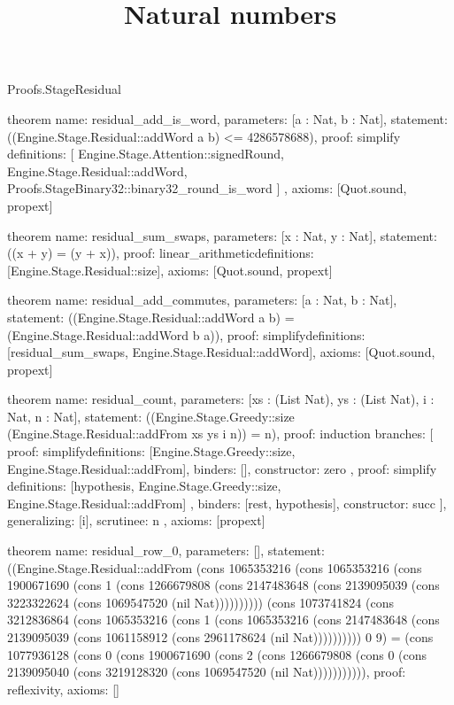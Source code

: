 \begin{lexlean}{Proofs.StageResidual}
\title{Natural numbers}
\begin{semanticmodule}
theorem{
  name: residual_add_is_word,
  parameters: [a : Nat, b : Nat],
  statement: ((Engine.Stage.Residual::addWord a b) <= 4286578688),
  proof: simplify{
    definitions: [
      Engine.Stage.Attention::signedRound,
      Engine.Stage.Residual::addWord,
      Proofs.StageBinary32::binary32_round_is_word
    ]
  },
  axioms: [Quot.sound, propext]
}

theorem{
  name: residual_sum_swaps,
  parameters: [x : Nat, y : Nat],
  statement: ((x + y) = (y + x)),
  proof: linear_arithmetic{definitions: [Engine.Stage.Residual::size]},
  axioms: [Quot.sound, propext]
}

theorem{
  name: residual_add_commutes,
  parameters: [a : Nat, b : Nat],
  statement: ((Engine.Stage.Residual::addWord a b) = (Engine.Stage.Residual::addWord b a)),
  proof: simplify{definitions: [residual_sum_swaps, Engine.Stage.Residual::addWord]},
  axioms: [Quot.sound, propext]
}

theorem{
  name: residual_count,
  parameters: [xs : (List Nat), ys : (List Nat), i : Nat, n : Nat],
  statement: ((Engine.Stage.Greedy::size (Engine.Stage.Residual::addFrom xs ys i n)) = n),
  proof: induction{
    branches: [
      {
        proof: simplify{definitions: [Engine.Stage.Greedy::size, Engine.Stage.Residual::addFrom]},
        binders: [],
        constructor: zero
      },
      {
        proof: simplify{
          definitions: [hypothesis, Engine.Stage.Greedy::size, Engine.Stage.Residual::addFrom]
        },
        binders: [rest, hypothesis],
        constructor: succ
      }
    ],
    generalizing: [i],
    scrutinee: n
  },
  axioms: [propext]
}

theorem{
  name: residual_row_0,
  parameters: [],
  statement: ((Engine.Stage.Residual::addFrom (cons 1065353216 (cons 1065353216 (cons 1900671690 (cons 1 (cons 1266679808 (cons 2147483648 (cons 2139095039 (cons 3223322624 (cons 1069547520 (nil Nat)))))))))) (cons 1073741824 (cons 3212836864 (cons 1065353216 (cons 1 (cons 1065353216 (cons 2147483648 (cons 2139095039 (cons 1061158912 (cons 2961178624 (nil Nat)))))))))) 0 9) = (cons 1077936128 (cons 0 (cons 1900671690 (cons 2 (cons 1266679808 (cons 0 (cons 2139095040 (cons 3219128320 (cons 1069547520 (nil Nat))))))))))),
  proof: reflexivity{},
  axioms: []
}
\end{semanticmodule}
\end{lexlean}
